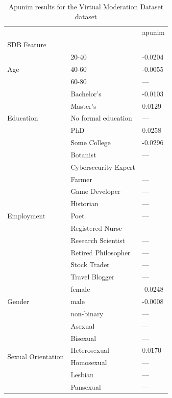 \begin{table}[t]
\caption{Apunim results for the Virtual Moderation Dataset dataset}
\label{tab:synthetic_vmd_apunim_only}
\begin{tabular}{lll}
\toprule
 &  & apunim \\
SDB Feature &  &  \\
\midrule
\multirow[t]{3}{*}{Age} & 20-40 & -0.0204 \\
 & 40-60 & -0.0055 \\
 & 60-80 & --- \\
\cline{1-3}
\multirow[t]{5}{*}{Education} & Bachelor's & -0.0103 \\
 & Master's & 0.0129 \\
 & No formal education & --- \\
 & PhD & 0.0258 \\
 & Some College & -0.0296 \\
\cline{1-3}
\multirow[t]{11}{*}{Employment} & Botanist & --- \\
 & Cybersecurity Expert & --- \\
 & Farmer & --- \\
 & Game Developer & --- \\
 & Historian & --- \\
 & Poet & --- \\
 & Registered Nurse & --- \\
 & Research Scientist & --- \\
 & Retired Philosopher & --- \\
 & Stock Trader & --- \\
 & Travel Blogger & --- \\
\cline{1-3}
\multirow[t]{3}{*}{Gender} & female & -0.0248 \\
 & male & -0.0008 \\
 & non-binary & --- \\
\cline{1-3}
\multirow[t]{6}{*}{Sexual Orientation} & Asexual & --- \\
 & Bisexual & --- \\
 & Heterosexual & 0.0170 \\
 & Homosexual & --- \\
 & Lesbian & --- \\
 & Pansexual & --- \\
\cline{1-3}
\bottomrule
\end{tabular}
\end{table}
